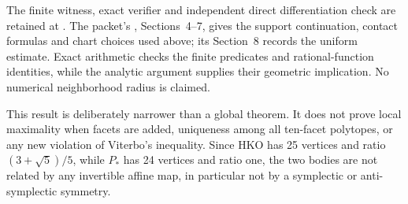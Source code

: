The finite witness, exact verifier and independent direct differentiation
check are retained at .
The packet's , Sections~4--7, gives the support continuation,
contact formulas and chart choices used above; its Section~8 records the
uniform estimate. Exact arithmetic checks the finite predicates and
rational-function identities, while the analytic argument supplies their
geometric implication. No numerical neighborhood radius is claimed.

This result is deliberately narrower than a global theorem. It does not
prove local maximality when facets are added, uniqueness among all ten-facet
polytopes, or any new violation of Viterbo's inequality. Since HKO has 25
vertices and ratio $(3+\sqrt5)/5$, while $P_*$ has 24 vertices and ratio one,
the two bodies are not related by any invertible affine map, in particular not
by a symplectic or anti-symplectic symmetry.
